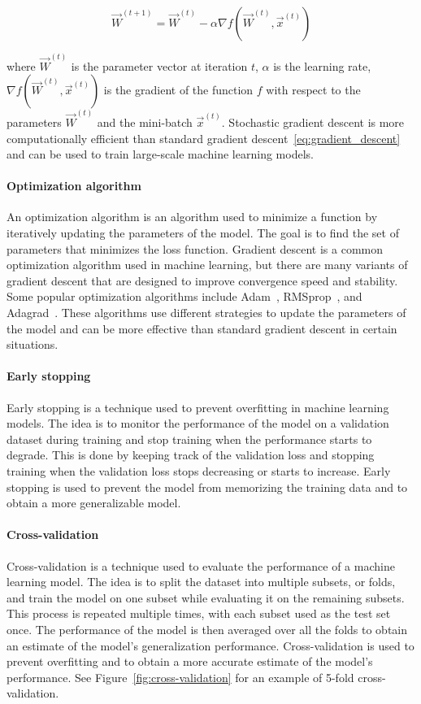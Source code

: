 \begin{equation} \label{eq:stochastic_gradient_descent}
    \vec{W}^{(t+1)} = \vec{W}^{(t)} - \alpha \nabla f(\vec{W}^{(t)}, \vec{x}^{(t)})
\end{equation}

where $\vec{W}^{(t)}$ is the parameter vector at iteration $t$, $\alpha$ is the learning rate, $\nabla f(\vec{W}^{(t)}, \vec{x}^{(t)})$ is the gradient of the function $f$ with respect to the parameters $\vec{W}^{(t)}$ and the mini-batch $\vec{x}^{(t)}$. Stochastic gradient descent is more computationally efficient than standard gradient descent~\ref{eq:gradient_descent} and can be used to train large-scale machine learning models.

\paragraph{Optimization algorithm}
An optimization algorithm is an algorithm used to minimize a function by iteratively updating the parameters of the model. The goal is to find the set of parameters that minimizes the loss function. Gradient descent is a common optimization algorithm used in machine learning, but there are many variants of gradient descent that are designed to improve convergence speed and stability. Some popular optimization algorithms include Adam~\cite{kingma2014adam}, RMSprop~\cite{graves2013generating}, and Adagrad~\cite{duchi2011adaptive}. These algorithms use different strategies to update the parameters of the model and can be more effective than standard gradient descent in certain situations. 

\paragraph{Early stopping}
Early stopping \cite{morgan1989generalization}\cite{prechelt2002early} is a technique used to prevent overfitting in machine learning models. The idea is to monitor the performance of the model on a validation dataset during training and stop training when the performance starts to degrade. This is done by keeping track of the validation loss and stopping training when the validation loss stops decreasing or starts to increase. Early stopping is used to prevent the model from memorizing the training data and to obtain a more generalizable model. 

\paragraph{Cross-validation}
Cross-validation is a technique used to evaluate the performance of a machine learning model. The idea is to split the dataset into multiple subsets, or folds, and train the model on one subset while evaluating it on the remaining subsets. This process is repeated multiple times, with each subset used as the test set once. The performance of the model is then averaged over all the folds to obtain an estimate of the model's generalization performance. Cross-validation is used to prevent overfitting and to obtain a more accurate estimate of the model's performance. See Figure~\ref{fig:cross-validation} for an example of 5-fold cross-validation.


